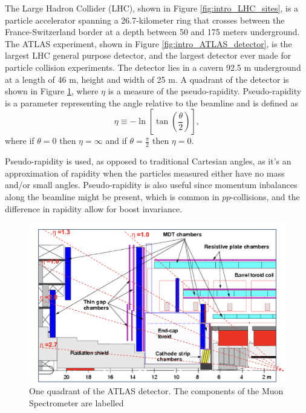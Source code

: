 The Large Hadron Collider (LHC), shown in Figure \ref{fig:intro_LHC_sites},  is a particle accelerator spanning a 26.7-kilometer ring that crosses between the France-Switzerland border at a depth between 50 and 175 meters underground.\cite{Bruning:782076}
The ATLAS experiment, shown in Figure \ref{fig:intro_ATLAS_detector}, is the largest LHC general purpose detector, and the largest detector ever made for particle collision experiments. 
The detector lies in a cavern 92.5 m underground at a length of 46 m, height and width of 25 m.\cite{ATLAS_Tech_Proposal}
A quadrant of the detector is shown in Figure \ref{fig:ATLAS_quadrant}, where $\eta$ is a measure of the pseudo-rapidity.
Pseudo-rapidity is a parameter representing the angle relative to the beamline and is defined as
\begin{equation}
    \eta \equiv -\ln\left[ \tan\left(\frac{\theta}{2}\right)\right],
\end{equation}  
where if $\theta = 0$ then $\eta = \infty$ and if $\theta = \frac{\pi}{2}$ then $\eta = 0$.

Pseudo-rapidity is used, as opposed to traditional Cartesian angles, as it's an approximation of rapidity when the particles measured either have no mass and/or small angles. 
Pseudo-rapidity is also useful since momentum inbalances along the beamline might be present, which is common in $pp$-collisions, and the difference in rapidity allow for boost invariance.      
\begin{figure}[h!]
    \centering
    \includegraphics[width=.8\textwidth]{content/img/ATLAS qudrant labelled MS.png}
    \caption{One quadrant of the ATLAS detector. The components of the Muon Spectrometer are labelled \cite{Hough_Transform_CSC}}
    \label{fig:ATLAS_quadrant}
\end{figure}

